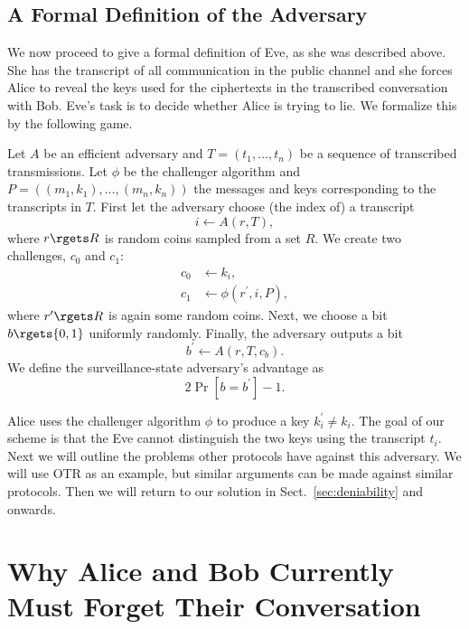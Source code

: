 \subsection{A Formal Definition of the Adversary}

We now proceed to give a formal definition of Eve, as she was described above.
She has the transcript of all communication in the public channel and she 
forces Alice to reveal the keys used for the ciphertexts in the transcribed
conversation with Bob.
Eve's task is to decide whether Alice is trying to lie.
We formalize this by the following game.

\begin{definition}\label{def:StateGame}
  Let \(A\) be an efficient adversary and \(T = ( t_1, \ldots, t_n )\) be 
  a sequence of transcribed transmissions.
  Let \(\phi\) be the challenger algorithm and \(P = ( (m_1, k_1), \ldots, 
    (m_n, k_n) )\) the messages and keys corresponding to the transcripts in 
  \(T\).
  First let the adversary choose (the index of) a transcript \[
    i\gets A( r, T ),
  \] where \(r\rgets R\) is random coins sampled from a set \(R\).
  We create two challenges, \(c_0\) and \(c_1\):
  \begin{align*}
    c_0 &\gets k_i, \\
    c_1 &\gets \phi( r^\prime, i, P ),
  \end{align*}
  where \(r^\prime\rgets R\) is again some random coins.
  Next, we choose a bit \(b\rgets \{0, 1\}\) uniformly randomly.
  Finally, the adversary outputs a bit \[
    b^\prime\gets A( r, T, c_b ).
  \]
  We define the surveillance-state adversary's advantage as
  \begin{equation}
    2 \Pr[ b = b^\prime ] - 1.
  \end{equation}
\end{definition}

Alice uses the challenger algorithm \(\phi\) to produce a key \(k_i^\prime\neq 
  k_i\).
The goal of our scheme is that the Eve cannot distinguish the two keys using 
the transcript \(t_i\).
Next we will outline the problems other protocols have against this adversary.
We will use \ac{OTR} as an example, but similar arguments can be made against 
similar protocols.
Then we will return to our solution in Sect.~\ref{sec:deniability} and onwards.


\section{Why Alice and Bob Currently Must Forget Their Conversation}
\label{sec:undeniability}

